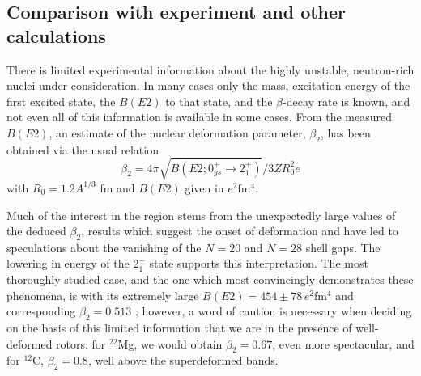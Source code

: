 \begin{multicols}{2}
\subsection{Comparison with experiment and other calculations}

There is limited experimental information about the highly unstable,
neutron-rich nuclei under consideration.  In many cases only the mass,
excitation energy of the first excited state, the $B(E2)$ to that state,
and the $\beta$-decay rate is known, and not even all of this
information is available in some cases.  From the
measured $B(E2)$, an estimate of the nuclear deformation parameter,
$\beta_2$, has been obtained via the usual relation
\begin{equation}
\beta_2 = 4 \pi \sqrt{B(E2; 0^+_{gs} \rightarrow 2^+_1)}/3 Z R_0^2 e
\end{equation}
with $R_0 = 1.2 A^{1/3}$ fm and $B(E2)$ given in $e^2$fm$^4$.

Much of the interest in the region stems from the unexpectedly large
values of the deduced $\beta_2$, results which suggest the onset of
deformation and have led to speculations about the vanishing of the $N
= 20$ and $N = 28$ shell gaps.  The lowering in energy of the 2$^+_1$
state supports this interpretation.  The most thoroughly studied case,
and the one which most convincingly demonstrates these phenomena, is
 with its extremely large $B(E2) = 454 \pm 78 \, e^2$fm$^4$ and
corresponding $\beta_2 = 0.513$ \cite{r:motobayashi}; however, a word of
caution is necessary when deciding on the basis of this
limited information that we are in the presence of well-deformed
rotors: for $^{22}$Mg, we would obtain $\beta_2 = 0.67$, even more
spectacular, and for $^{12}$C, $\beta_2 = 0.8$, well above the
superdeformed bands.


\end{multicols}
